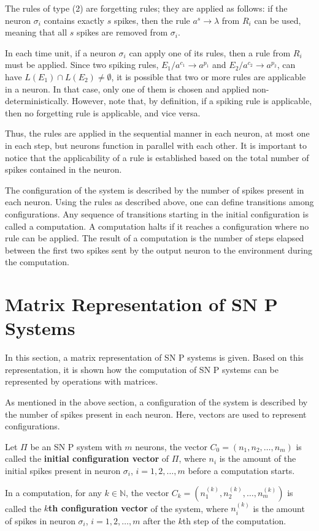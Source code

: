 \documentclass[runningheads]{llncs}
\begin{document}
The rules of type (2) are forgetting rules; they are applied as
follows: if the neuron $\sigma_i$ contains exactly $s$ spikes, then
the rule $a^s\rightarrow \lambda$ from $R_i$ can be used, meaning
that all $s$ spikes are removed from $\sigma_i$.


In each time unit, if a neuron $\sigma_i$ can apply one of its
rules, then a rule from $R_i$ must be applied. Since two spiking
rules, $E_1/a^{c_1}\rightarrow a^{p_1}$ and $E_2/a^{c_2}\rightarrow
a^{p_2}$, can have $L(E_1) \cap L(E_2)\neq \emptyset$, it is
possible that two or more rules are applicable in a neuron. In that
case, only one of them is chosen and applied non-deterministically.
However, note that, by definition, if a spiking rule is applicable,
then no forgetting rule is applicable, and vice versa.

Thus, the rules are applied in the sequential manner in each neuron,
at most one in each step, but neurons function in parallel with each
other. It is important to notice that the applicability of a rule is
established based on the total number of spikes contained in the
neuron.

The configuration of the system is described by the number of spikes
present in each neuron. Using the rules as described above, one can
define transitions among configurations. Any sequence of transitions
starting in the initial configuration is called a computation. A
computation halts if it reaches a configuration where no rule can be
applied. The result of a computation is the number of steps elapsed
between the first two spikes sent by the output neuron to the
environment during the computation.

\section{Matrix Representation of SN P Systems}\label{define-Mat}

In this section, a matrix representation of SN P systems is given.
Based on this representation, it is shown how the computation of SN
P systems can be represented by operations with matrices.

As mentioned in the above section, a configuration of the system is
described by the number of spikes present in each neuron. Here,
vectors are used to represent configurations.

\begin{definition}\label{def_config_vec}
Let $\Pi$ be an SN P system with $m$ neurons, the vector $C_{0} =
(n_{1}, n_{2}, \ldots , n_{m})$ is called the {\bf initial
configuration vector} of $\Pi$, where $n_{i}$ is the amount of the
initial spikes present in neuron $\sigma_i$, $i=1,2, \ldots , m$
before a computation starts.

In a computation, for any $k \in \mathbb N$, the vector $C_{k} =
(n_{1}^{(k)}, n_{2}^{(k)}, \ldots , n_{m}^{(k)})$ is called the {\bf
$k$th configuration vector} of the system, where $n_{i}^{(k)}$ is
the amount of spikes in neuron $\sigma_i$, $i=1,2, \ldots, m$ after
the $k$th step of the computation.
\end{definition}
\end{document}
